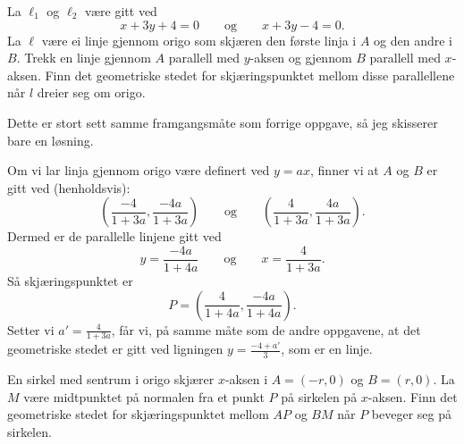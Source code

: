 \documentclass[11pt, norsk]{article}
\begin{document}
\begin{oppg}
La $\ell_1$ og $\ell_2$ være gitt ved
$$
x + 3y+4=0 \qquad \text{og} \qquad x+3y-4=0.
$$
La $\ell$ være ei linje gjennom origo som skjæren den første linja i $A$ og den andre i $B$. Trekk en linje gjennom $A$ parallell med $y$-aksen og gjennom $B$ parallell med $x$-aksen. Finn det geometriske stedet for skjæringspunktet mellom disse parallellene når $l$ dreier seg om origo.
\end{oppg}

\begin{losn}
Dette er stort sett samme framgangsmåte som forrige oppgave, så jeg skisserer bare en løsning.

Om vi lar linja gjennom origo være definert ved $y=ax$, finner vi at $A$ og $B$ er gitt ved (henholdsvis):
$$
\left( \frac{-4}{1+3a}, \frac{-4a}{1+3a} \right) \qquad \text{og} \qquad 
\left( \frac{4}{1+3a}, \frac{4a}{1+3a} \right).
$$
Dermed er de parallelle linjene gitt ved 
$$
y = \frac{-4a}{1+4a} \qquad \text{og} \qquad x = \frac{4}{1+3a}.
$$
Så skjæringspunktet er
$$
P = \left(\frac{4}{1+4a}, \frac{-4a}{1+4a} \right).
$$
Setter vi $a' = \frac{4}{1+3a}$, får vi, på samme måte som de andre oppgavene, at det geometriske stedet er gitt ved ligningen $y = \frac{-4+a'}{3}$, som er en linje.
\end{losn}

\begin{oppg}
En sirkel med sentrum i origo skjærer $x$-aksen i $A=(-r,0)$ og $B=(r,0)$. La $M$ være midtpunktet på normalen fra et punkt $P$ på sirkelen på $x$-aksen. Finn det geometriske stedet for skjæringspunktet mellom $AP$ og $BM$ når $P$ beveger seg på sirkelen.
\end{oppg}
\end{document}

